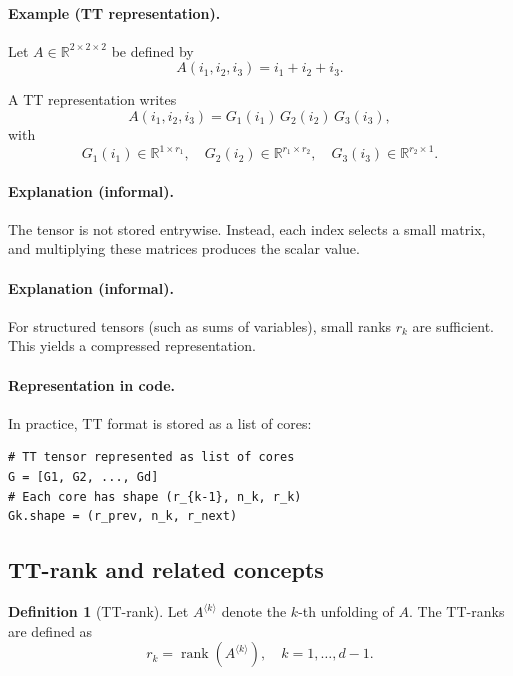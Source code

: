 \documentclass[11pt,a4paper,parskip=half-]{scrartcl}
\theoremstyle{definition}
\newtheorem{definition}{Definition}[section]
\theoremstyle{plain}
\theoremstyle{remark}
\begin{document}
\paragraph{Example (TT representation).}
Let $A \in \mathbb{R}^{2 \times 2 \times 2}$ be defined by
\[
A(i_1,i_2,i_3) = i_1 + i_2 + i_3.
\]

A TT representation writes
\[
A(i_1,i_2,i_3) = G_1(i_1)\,G_2(i_2)\,G_3(i_3),
\]
with
\[
G_1(i_1) \in \mathbb{R}^{1 \times r_1}, \quad
G_2(i_2) \in \mathbb{R}^{r_1 \times r_2}, \quad
G_3(i_3) \in \mathbb{R}^{r_2 \times 1}.
\]

\paragraph{Explanation (informal).}
The tensor is not stored entrywise. Instead, each index selects a small matrix,
and multiplying these matrices produces the scalar value.

\paragraph{Explanation (informal).}
For structured tensors (such as sums of variables), small ranks $r_k$ are
sufficient. This yields a compressed representation.

\paragraph{Representation in code.}

In practice, TT format is stored as a list of cores:

\begin{verbatim}
# TT tensor represented as list of cores
G = [G1, G2, ..., Gd]
# Each core has shape (r_{k-1}, n_k, r_k)
Gk.shape = (r_prev, n_k, r_next)
\end{verbatim}

\subsection{TT-rank and related concepts}

\begin{definition}[TT-rank]
  Let $A^{\langle k\rangle}$ denote the $k$-th unfolding of $A$.
  The TT-ranks are defined as
  \[
    r_k = \operatorname{rank}\!\left(A^{\langle k\rangle}\right),
    \quad k=1,\dots,d-1.
  \]
\end{definition}
\end{document}
